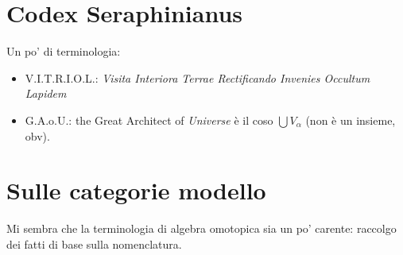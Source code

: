 \documentclass[10pt,a4paper]{amsart}
\begin{document}
\section{Codex Seraphinianus }
Un po' di terminologia:
\begin{itemize}
\item V.I.T.R.I.O.L.: \emph{Visita Interiora Terrae Rectificando Invenies Occultum Lapidem}
\item G.A.o.U.: the Great Architect of \emph{Universe} è il coso $\bigcup V_\alpha$ (non è un insieme, obv).
\end{itemize}
\section{Sulle categorie modello}
Mi sembra che la terminologia di algebra omotopica sia un po' carente: raccolgo dei fatti di base sulla nomenclatura.
\end{document}
